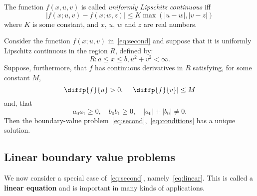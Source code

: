 \begin{frame}[t]{\subsecname}
The function $f\left(x,u,v\right)$ is called
\emph{uniformly Lipschitz continuous} iff
\begin{equation}
	\left|f\left(x;u,v\right)-
	f\left(x;w,z\right)\right|\leq
	K\max\left(\left|u-w\right|,\left|v-z\right|\right)
\end{equation}
where $K$ is some constant, and $x$, $u$, $w$ and $z$ are real numbers.

Consider the function $f\left(x;u,v\right)$ in~\eqref{eq:second} and
suppose that it is uniformly Lipschitz continuous in the region $R$,
defined by:
\begin{equation}
	R\colon a\leq x\leq b, u^{2}+v^{2}<\infty.
\end{equation}
Suppose, furthermore, that $f$ has continuous derivatives in $R$
satisfying, for some constant $M$,
\begin{equation}
	\diffp{f}{u}>0,\quad\left|\diffp{f}{v}\right|\leq M
\end{equation}
and, that
\begin{equation}
	a_{0}a_{1}\geq0,\quad b_{0}b_{1}\geq
	0,\quad\left|a_{0}\right|
	+\left|b_{0}\right|\neq0.
\end{equation}
Then the boundary-value problem~\eqref{eq:second},~\eqref{eq:conditions}
has a unique solution.
\end{frame}

\subsection{Linear boundary value problems}


\begin{frame}[t]{\subsecname}
We now consider a special case of~\eqref{eq:second},
namely~\eqref{eq:linear}. This is called a \textbf{linear equation}
and is important in many kinds of applications.
\end{frame}